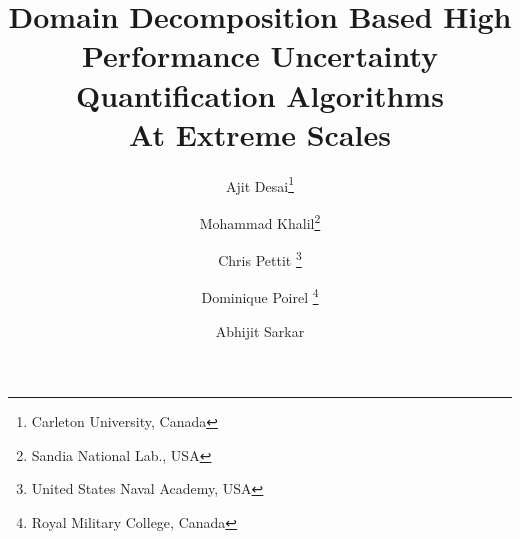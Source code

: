 

\usepackage{lipsum}
\usepackage{amsfonts}
\usepackage{graphicx}
\usepackage{epstopdf}
\usepackage{algorithmic}
\usepackage{amssymb}
\usepackage{cleveref}
\ifpdf
\else
\fi

\newcommand{\TheTitle}{Domain Decomposition Based High Performance Uncertainty Quantification Algorithms \\ At Extreme Scales}
\newcommand{\TheAuthors}{Desai A., Khalil M., Pettit C., Poirel D. and Sarkar A.}



\title{{\TheTitle}}%

\author{
  Ajit Desai\thanks{Carleton University, Canada}
  \and
  Mohammad Khalil\thanks{Sandia National Lab., USA}
  \and
  Chris Pettit \thanks{United States Naval Academy, USA}
  \and
  Dominique Poirel \thanks{Royal Military College, Canada}
  \and
  Abhijit Sarkar\footnotemark[1]
}

\usepackage{amsopn}
\DeclareMathOperator{\diag}{diag}


